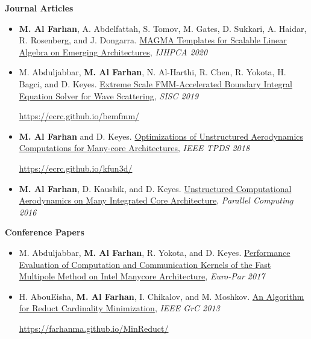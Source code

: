 \documentclass[9pt,a4paper]{extarticle}
\begin{document}
{
\textbf{Journal Articles}
\begin{itemize}
\item
\textbf{M. Al Farhan}, A. Abdelfattah, S. Tomov, M. Gates, D. Sukkari, A. Haidar,
R. Rosenberg, and J. Dongarra.
\href{}
{MAGMA Templates for Scalable Linear Algebra on Emerging
Architectures}, \textit{IJHPCA 2020}
\item
M. Abduljabbar, \textbf{M. Al Farhan}, N. Al-Harthi, R. Chen, R. Yokota, H. Bagci,
and D. Keyes. \href{https://epubs.siam.org/doi/10.1137/18M1173599}
{{Extreme Scale FMM-Accelerated Boundary Integral Equation
Solver for Wave Scattering}}, \textit{SISC 2019}

\url{https://ecrc.github.io/bemfmm/}
\item
\textbf{M. Al Farhan} and D. Keyes.
\href{https://ieeexplore.ieee.org/document/8337750}
{{Optimizations of Unstructured Aerodynamics Computations
for Many-core Architectures}}, \textit{IEEE TPDS 2018}

\url{https://ecrc.github.io/kfun3d/}
\item
\textbf{M. Al Farhan},
D. Kaushik, and D. Keyes.
\href{https://www.sciencedirect.com/science/article/pii/S0167819116300564}
{{Unstructured Computational Aerodynamics on Many
Integrated Core Architecture}}, \textit{Parallel Computing 2016}\\
\end{itemize}

\textbf{Conference Papers}
\begin{itemize}
\item
M. Abduljabbar,
\textbf{M. Al Farhan},
R. Yokota, and D. Keyes.
\href{https://link.springer.com/chapter/10.1007/978-3-319-64203-1_40}
{{Performance Evaluation of Computation and Communication
Kernels of the Fast Multipole Method on Intel Manycore Architecture}},
\textit{Euro-Par 2017}
\item
H. AbouEisha,
\textbf{M. Al Farhan},
I. Chikalov, and M. Moshkov.
\href{https://ieeexplore.ieee.org/document/6740370}
{{An Algorithm for Reduct Cardinality Minimization}},
\textit{IEEE GrC 2013}

\url{https://farhanma.github.io/MinReduct/}\\
\end{itemize}

}
\end{document}
